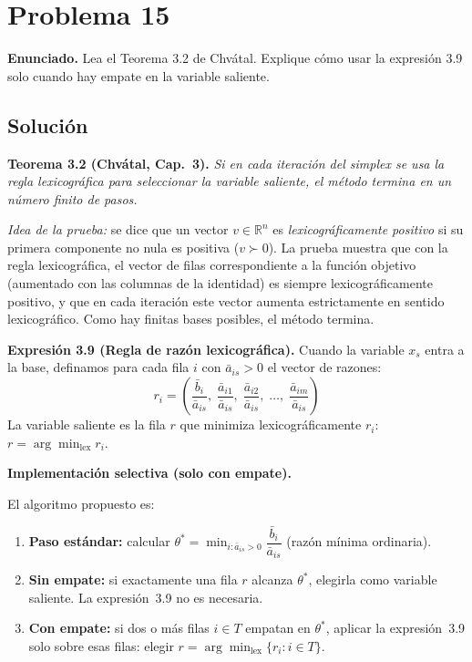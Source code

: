 \documentclass{article}
\begin{document}
\newpage
\section*{Problema 15}

\textbf{Enunciado.} Lea el Teorema 3.2 de Chvátal. Explique cómo usar la expresión 3.9 solo cuando hay empate en la variable saliente.

\subsection*{Solución}

\textbf{Teorema 3.2 (Chvátal, Cap.\ 3).} \textit{Si en cada iteración del simplex se usa la regla lexicográfica para seleccionar la variable saliente, el método termina en un número finito de pasos.}

\textit{Idea de la prueba:} se dice que un vector $v\in\mathbb{R}^n$ es \emph{lexicográficamente positivo} si su primera componente no nula es positiva ($v\succ 0$). La prueba muestra que con la regla lexicográfica, el vector de filas correspondiente a la función objetivo (aumentado con las columnas de la identidad) es siempre lexicográficamente positivo, y que en cada iteración este vector aumenta estrictamente en sentido lexicográfico. Como hay finitas bases posibles, el método termina.

\textbf{Expresión 3.9 (Regla de razón lexicográfica).} Cuando la variable $x_s$ entra a la base, definamos para cada fila $i$ con $\bar{a}_{is}>0$ el vector de razones:
$$r_i = \left(\frac{\bar{b}_i}{\bar{a}_{is}},\;\frac{\bar{a}_{i1}}{\bar{a}_{is}},\;\frac{\bar{a}_{i2}}{\bar{a}_{is}},\;\ldots,\;\frac{\bar{a}_{im}}{\bar{a}_{is}}\right)$$
La variable saliente es la fila $r$ que minimiza lexicográficamente $r_i$: $r=\arg\min_{\text{lex}} r_i$.

\textbf{Implementación selectiva (solo con empate).}

El algoritmo propuesto es:

\begin{enumerate}[1.]
  \item \textbf{Paso estándar:} calcular $\theta^*=\min_{i:\bar{a}_{is}>0}\dfrac{\bar{b}_i}{\bar{a}_{is}}$ (razón mínima ordinaria).
  \item \textbf{Sin empate:} si exactamente una fila $r$ alcanza $\theta^*$, elegirla como variable saliente. La expresión~3.9 no es necesaria.
  \item \textbf{Con empate:} si dos o más filas $i\in T$ empatan en $\theta^*$, aplicar la expresión~3.9 solo sobre esas filas: elegir $r=\arg\min_{\text{lex}}\{r_i:i\in T\}$.
\end{enumerate}
\end{document}
